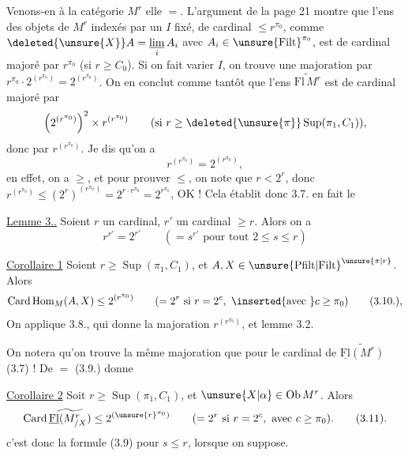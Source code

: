 
Venons-en à la catégorie $M^r$ elle $=$. L'argument
de la page 21 montre que l'ens des 
objets de $M^r$ indexés par un $I$ fixé, de cardinal $\leq r^{\pi_0}$, comme
$\deleted{\unsure{X}}A=\underset{i}{\underline{\lim}}\,A_i$ avec $A_i\in\unsure{\mathrm{Filt}}^{\pi_0}$, est de cardinal
majoré par $r^{\pi_0}$ (si $r\geq C_0$). Si on fait varier
$I$, on trouve  une majoration par $r^{\pi_0}\mathbin{\cdot}2^{(r^{\pi_0})}
=2^{(r^{\pi_0})}$. On en conclut comme tantôt que
l'ens $\widetilde{\mathrm{Fl}\, M^r}$ est de cardinal majoré par
\[
\left(2^{(r^{\pi_0})}\right)^2\times r^{(r^{\pi_0})}
\qquad(\text{si }r\geq\deleted{\unsure{\pi}}\operatorname{Sup}(\pi_1,C_1)),
\]
donc par $r^{(r^{\pi_0})}$. Je dis qu'on a
\[
r^{(r^{\pi_0})}=2^{(r^{\pi_0})},
\]
en effet, on a $\geq$, et pour prouver $\leq$, on
note que $r<2^r$, donc $r^{(r^{\pi_0})}\leq(2^r)^{(r^{\pi_0})}=2^{r\mathbin{\cdot}r^{\pi_0}}=2^{r^{\pi_0}}$,
OK ! Cela établit donc 3.7.  
 en fait le

\uline{Lemme 3..} Soient $r$ un cardinal, $r'$ un cardinal $\geq r$. Alors
on a
\[
r^{r'}=2^{r'}\qquad(=s^{r'}\text{ pour tout }2\leq s\leq r)
\]

\uline{Corollaire 1} Soient  $r\geq\operatorname{Sup}(\pi_1,C_1)$,
et $A,X\in\unsure{\mathrm{Pfilt}|\mathrm{Filt}}^{\unsure{\pi|r}}$. Alors
\[
\operatorname{Card}\operatorname{Hom}_M(A,X)\leq 2^{(r^{\pi_0})}
\qquad(=2^r\text{ si }r=2^c,\ \inserted{\text{avec }}c\geq\pi_0)
\tag*{(3.10.),}
\]
On applique 3.8.,  qui donne la majoration
$r^{(r^{\pi_0})}$, et  lemme 3.2.

 On notera qu'on trouve la même
majoration que pour le cardinal de $\widetilde{\underline{\mathrm{Fl}}(M^r)}$
 (3.7) ! De $=$ (3.9.) donne

\uline{Corollaire 2} Soit $r\geq\operatorname{Sup}(\pi_1,C_1)$, et $\unsure{X|\alpha}\in\operatorname{Ob}M^r$. Alors
\[
\operatorname{Card}\widetilde{\underline{\mathrm{Fl}}(M^r_{/X})}\leq 2^{(\unsure{r}^{\pi_0})}
\qquad(=2^r\text{ si }r=2^c,\text{ avec }c\geq\pi_0).
\tag*{(3.11).}
\]
c'est donc la formule (3.9) pour $s\leq r$, lorsque on
suppose.
